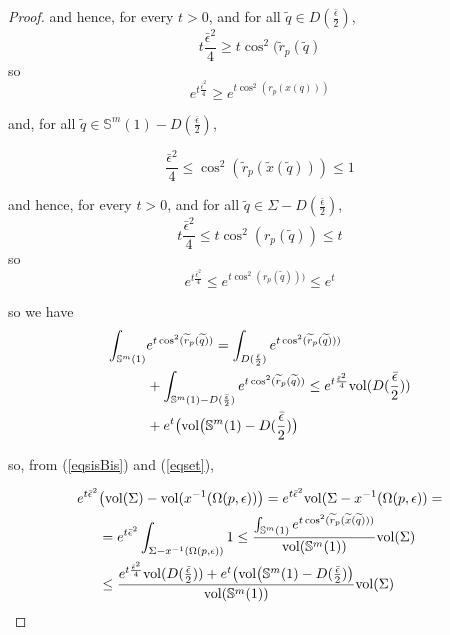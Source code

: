 \documentclass{amsart}
\theoremstyle{definition}
\theoremstyle{remark}
\newcommand{\ese}{\mathbb{S}}
\begin{document}
\begin{proof}
\noindent and hence, for every $t >0$, and for all $\widetilde{q} \in  D(\frac{\bar\epsilon}{2})$, $$t\frac{\bar\epsilon^2}{4} \geq t\cos^2(\widetilde{r}_p(\widetilde{q})$$
\noindent so $$e^{t\frac{\bar\epsilon^2}{4} } \geq e^{t\cos^2(r_p(x(q)))}$$

\noindent and, for all $\widetilde{q} \in \ese^m(1)-D(\frac{\bar\epsilon}{2})$,

$$\frac{\bar\epsilon^2}{4} \leq \cos^2(\widetilde{r}_p(\widetilde{x}(\widetilde{q})))\leq  1 $$

\noindent and hence, for every $t >0$, and for all $\widetilde{q} \in \Sigma- D(\frac{\bar\epsilon}{2})$,$$t\frac{\bar\epsilon^2}{4}\leq t \cos^2(r_p(\widetilde{q}))\leq t$$
\noindent so $$e^{t\frac{\bar\epsilon^2}{4}} \leq e^{t\cos^2(r_p(\widetilde{q})))} \leq e^t$$



\noindent so we have
\begin{equation}\label{eqset}
\begin{aligned}
\int_{\mathbb{S}^m(1)} &e^{t\cos^2(\widetilde{r}_p(\widetilde{q}))} =\int_{D(\frac{\bar\epsilon}{2})}e^{t \cos^2(\widetilde{r}_p(\widetilde{q})))} \\&+\int_{\mathbb{S}^m(1)-D(\frac{\bar\epsilon}{2})} e^{t\cos^2(\widetilde{r}_p(\widetilde{q}))}
\leq e^{t\frac{ \bar\epsilon^2}{4} }{\rm vol}(D(\frac{\bar\epsilon}{2})) 
\\&+e^t \big({\rm vol}\big(\mathbb{S}^m(1)-D(\frac{\bar\epsilon}{2})\big)
\end{aligned}
\end{equation}

\noindent so, from (\ref{eqsisBis}) and (\ref{eqset}),

\begin{equation}\label{eqvuit}
 \begin{aligned}
e^{t\bar\epsilon^2}&\big({\rm vol}(\Sigma)-{\rm vol}(x^{-1}(\Omega(p,\epsilon))\big)=e^{t\bar\epsilon^2}{\rm vol}(\Sigma-x^{-1}(\Omega(p,\epsilon))=\\&=e^{t\bar\epsilon^2}\int_{\Sigma-x^{-1}(\Omega(p,\epsilon))} 1 \leq \frac{\int_{\mathbb{S}^m(1)}e^{t \cos^2(\widetilde{r}_p(\widetilde{x}(\widetilde{q})))}}{{\rm vol}(\mathbb{S}^m(1))} {\rm vol}(\Sigma)\\
&\leq \frac{e^{t\frac{ \bar\epsilon^2}{4} }{\rm vol}(D(\frac{\bar\epsilon}{2})) 
+e^t \big({\rm vol}\big(\mathbb{S}^m(1)-D(\frac{\bar\epsilon}{2})\big)}{{\rm vol}(\mathbb{S}^m(1))}{\rm vol}(\Sigma)
\end{aligned}
\end{equation}


\end{proof}
\end{document}
